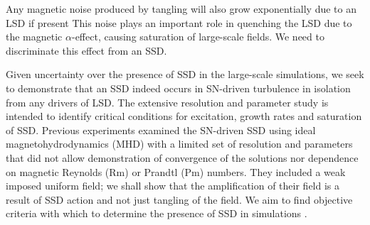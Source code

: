 \documentclass[preprint2]{aastex63}
\begin{document}
 Any magnetic noise produced by tangling will also grow exponentially due to
 an LSD if present
 This noise plays an important role in quenching the LSD due to the magnetic
 $\alpha$-effect, causing saturation of large-scale fields.
 We need to discriminate this effect from an SSD.   

 Given uncertainty over the presence of SSD in the large-scale simulations,
 we seek to demonstrate that an SSD indeed occurs in SN-driven turbulence
 in isolation from any drivers of LSD.
 The extensive resolution and parameter study is intended to identify critical
 conditions for excitation, growth rates and saturation of SSD.
 Previous experiments \citep[e.g.,][]{BKMM04,BalKim05,MacLow:2005}
 examined the SN-driven SSD using ideal magnetohydrodynamics (MHD) with
 a limited set of resolution and parameters that did not allow
 demonstration of convergence of the solutions nor dependence on
 magnetic Reynolds (Rm) or Prandtl (Pm) numbers.
 They included a weak imposed uniform field; we shall show
 that the amplification of their field is a result
 of SSD action and not just tangling of the field.
 We aim to find objective criteria with which to determine the presence of SSD
 in simulations \citep[such as][]{Gent:2013b,GE20}.
\end{document}
